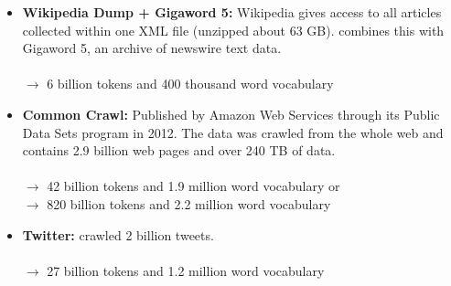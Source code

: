 \begin{itemize}
  \item 
    \textbf{Wikipedia Dump + Gigaword 5:} Wikipedia gives access to all articles 
    collected within one XML file (unzipped about 63 GB). \cite{pennington2014glove} 
    combines this with Gigaword 5, an archive of newswire text data. \\ \\
    $\rightarrow$ 6 billion tokens and 400 thousand word vocabulary

  \item 
    \textbf{Common Crawl:} Published by Amazon Web Services through its Public Data 
    Sets program in 2012. The data was crawled from the whole web and contains 
    2.9 billion web pages and over 240 TB of data. \\ \\
    $\rightarrow$ 42 billion tokens and 1.9 million word vocabulary or \\
    $\rightarrow$ 820 billion tokens and 2.2 million word vocabulary
  
  \item 
    \textbf{Twitter:} \cite{pennington2014glove} crawled 2 billion tweets. \\ \\
    $\rightarrow$ 27 billion tokens and 1.2 million word vocabulary
\end{itemize}
  
